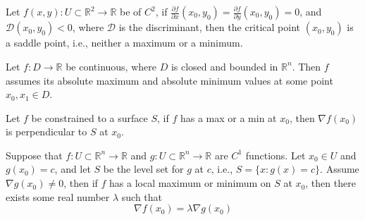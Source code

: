 \documentclass[openany]{book}
\newcommand{\R}{\mathbb{R}}
\begin{document}
\begin{prop}
    Let $f(x,y):U\subset\R^2\to \R$ be of  $C^2$, if $\frac{\partial f}{\partial x}(x_0,y_0)=\frac{\partial f}{\partial y}(x_0,y_0)=0$, and $\mathcal{D}(x_0,y_0)<0$, where $\mathcal{D}$ is the discriminant, then the critical point $(x_0,y_0)$ is a saddle point, i.e., neither a maximum or a minimum.
\end{prop}


\begin{prop}
    Let $f:D\to\R$ be continuous, where $D$ is closed and bounded in $\R^n$. Then $f$ assumes its absolute maximum and absolute minimum values at some point $x_0, x_1\in D$.
\end{prop}









\begin{prop}
    Let $f$ be constrained to a surface $S$, if $f$ has a max or a min at $x_0$, then $\nabla f(x_0)$ is perpendicular to $S$ at $x_0$.    
\end{prop}

\begin{prop}[Lagrange]
    Suppose that $f:U\subset\R^n\to\R$ and $g:U\subset\R^n\to\R$ are $C^1$ functions. Let $x_0\in U$ and $g(x_0)=c$, and let $S$ be the level set for $g$ at $c$, i.e., $S=\{x: g(x)=c\}$. Assume $\nabla g(x_0)\neq 0$, then if $f$ has a local maximum or minimum on $S$ at $x_0$, then there exists some real number $\lambda$ such that
    \begin{equation*}
        \nabla f(x_0)=\lambda \nabla g(x_0)
    \end{equation*}
\end{prop}
\end{document}
